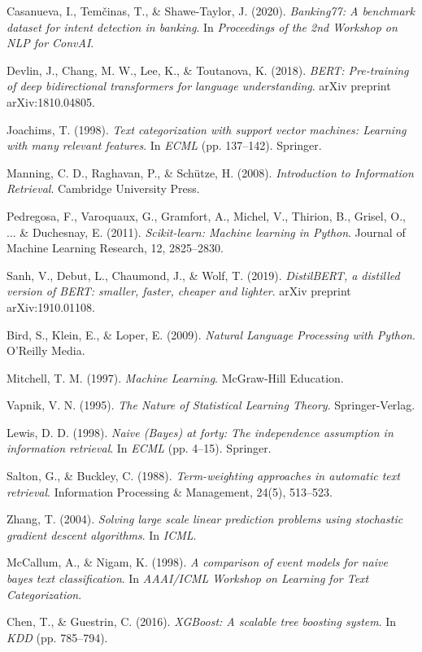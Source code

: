 \documentclass[12pt,a4paper]{article}
\begin{document}
\begin{enumerate}[leftmargin=*, label={[\arabic*]}]
    \item Casanueva, I., Tem\v{c}inas, T., \& Shawe-Taylor, J. (2020). \textit{Banking77: A benchmark dataset for intent detection in banking}. In \textit{Proceedings of the 2nd Workshop on NLP for ConvAI}.
    \item Devlin, J., Chang, M. W., Lee, K., \& Toutanova, K. (2018). \textit{BERT: Pre-training of deep bidirectional transformers for language understanding}. arXiv preprint arXiv:1810.04805.
    \item Joachims, T. (1998). \textit{Text categorization with support vector machines: Learning with many relevant features}. In \textit{ECML} (pp. 137--142). Springer.
    \item Manning, C. D., Raghavan, P., \& Sch\"utze, H. (2008). \textit{Introduction to Information Retrieval}. Cambridge University Press.
    \item Pedregosa, F., Varoquaux, G., Gramfort, A., Michel, V., Thirion, B., Grisel, O., ... \& Duchesnay, E. (2011). \textit{Scikit-learn: Machine learning in Python}. Journal of Machine Learning Research, 12, 2825--2830.
    \item Sanh, V., Debut, L., Chaumond, J., \& Wolf, T. (2019). \textit{DistilBERT, a distilled version of BERT: smaller, faster, cheaper and lighter}. arXiv preprint arXiv:1910.01108.
    \item Bird, S., Klein, E., \& Loper, E. (2009). \textit{Natural Language Processing with Python}. O'Reilly Media.
    \item Mitchell, T. M. (1997). \textit{Machine Learning}. McGraw-Hill Education.
    \item Vapnik, V. N. (1995). \textit{The Nature of Statistical Learning Theory}. Springer-Verlag.
    \item Lewis, D. D. (1998). \textit{Naive (Bayes) at forty: The independence assumption in information retrieval}. In \textit{ECML} (pp. 4--15). Springer.
    \item Salton, G., \& Buckley, C. (1988). \textit{Term-weighting approaches in automatic text retrieval}. Information Processing \& Management, 24(5), 513--523.
    \item Zhang, T. (2004). \textit{Solving large scale linear prediction problems using stochastic gradient descent algorithms}. In \textit{ICML}.
    \item McCallum, A., \& Nigam, K. (1998). \textit{A comparison of event models for naive bayes text classification}. In \textit{AAAI/ICML Workshop on Learning for Text Categorization}.
    \item Chen, T., \& Guestrin, C. (2016). \textit{XGBoost: A scalable tree boosting system}. In \textit{KDD} (pp. 785--794).
\end{enumerate}
\end{document}
